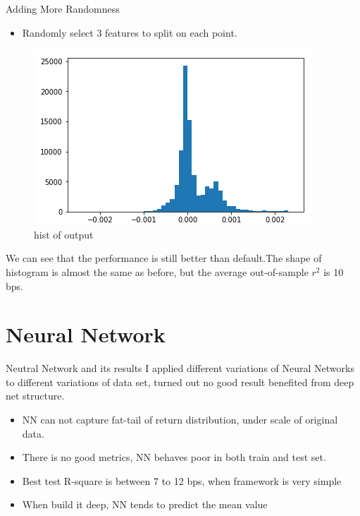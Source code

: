 \documentclass{beamer}
\begin{document}
\begin{frame}{Adding More Randomness}
\begin{itemize}
    \item Randomly select 3 features to split on each point.
\end{itemize}

\begin{figure}[ht]
        \centering
        \includegraphics[width=0.7\linewidth,height=0.4\linewidth]{hist_of_random.png}
        \caption{hist of output}
        \label{fig:label}
    \end{figure}

We can see that the performance is still better than default.The shape of histogram is almost the same as before, but the average out-of-sample $r^2$ is 10 bps. 
\end{frame}
\section{Neural Network}
\begin{frame}{Neutral Network and its results}
    I applied different variations of Neural Networks to different variations of data set, turned out no good result benefited from deep net structure.
    \begin{itemize}
        \item NN can not capture fat-tail of return distribution, under scale of original data.
        \item There is no good metrics, NN behaves poor in both train and test set.
        \item Best test R-square is between 7 to 12 bps, when framework is very simple
        \item When build it deep, NN tends to predict the mean value
    \end{itemize}
\end{frame}
\end{document}

